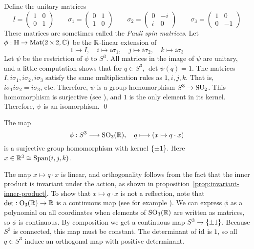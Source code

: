 \proof
Define the unitary matrices
\[            I = \begin{pmatrix}1 &  0 \\ 0 &  1\end{pmatrix}
\qquad \sigma_1 = \begin{pmatrix}0 &  1 \\ 1 &  0\end{pmatrix}
\qquad \sigma_2 = \begin{pmatrix}0 & -i \\ i &  0\end{pmatrix}
\qquad \sigma_3 = \begin{pmatrix}1 &  0 \\ 0 & -1\end{pmatrix} \]
These matrices are sometimes called the \emph{Pauli spin matrices}.
Let $\phi: \H \to \Mat(2 \times 2, \C)$ be the $\R$-linear extension of
\[    1 \longmapsto I,
\quad i \longmapsto i \sigma_1,
\quad j \longmapsto i \sigma_2,
\quad k \longmapsto i \sigma_3 \]
Let $\psi$ be the restriction of $\phi$ to $S^3\!$.
All matrices in the image of $\psi$ are unitary,
and a little computation shows that for $q \in S^3\!$,
$\det \psi(q) = 1$.
The matrices $I, i\sigma_1, i\sigma_2, i\sigma_3$
satisfy the same multiplication rules as $1, i, j, k$.
That is, $i\sigma_1 i\sigma_2 = i\sigma_3$, etc.
Therefore, $\psi$ is a group homomorphism $S^3 \to \SUC$.
This homomorphism is surjective (see \parencite[p.~173]{szekeres2004}),
and $1$ is the only element in its kernel.
Therefore, $\psi$ is an isomorphism.
\qed

The map
\[ \phi: S^3 \longto \SOR,
\quad q \longmapsto (x \mapsto q \cdot x) \]
is a surjective group homomorphism with kernel $\set{\pm 1}$.
Here $x \in \R^3 \cong \Span(i, j, k)$.

\proof
The map $x \mapsto q \cdot x$ is linear,
and orthogonality follows from
the fact that the inner product is invariant under the action,
as shown in proposition~\ref{prop:invariant-inner-product}.
To show that $x \mapsto q \cdot x$ is not a reflection,
note that $\det : \textup{O}_3(\R) \to \R$ is a continuous map
(see for example \parencite[p.~281]{hatcher2002}).
We can express $\phi$ as a polynomial on all coordinates
when elements of $\SOR$ are written as matrices,
so $\phi$ is continuous.
By composition we get a continuous map $S^3 \to \set{\pm 1}$.
Because $S^3$ is connected, this map must be constant.
The determinant of $\id$ is $1$,
so all $q \in S^3$ induce an orthogonal map with positive determinant.

